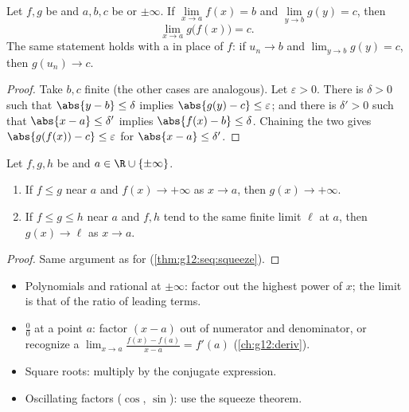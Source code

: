 \begin{theorem}\label{thm:g12:limcont:composition}
Let $f, g$ be  and $a, b, c$ be  or $\pm\infty$. If
$\lim\limits_{x \to a} f(x) = b$ and $\lim\limits_{y \to b} g(y) = c$, then
\[
\lim_{x \to a} g\bigl(f(x)\bigr) = c .
\]
The same statement holds with a  in place of $f$: if
$u_n \to b$ and $\lim_{y\to b} g(y) = c$, then $g(u_n) \to c$.
\end{theorem}

\begin{proof}
Take $b, c$ finite (the other cases are analogous). Let $\varepsilon > 0$.
There is $\delta > 0$ such that $\abs{y - b} \leq \delta$ implies
$\abs{g(y) - c} \leq \varepsilon$; and there is $\delta' > 0$ such that
$\abs{x - a} \leq \delta'$ implies $\abs{f(x) - b} \leq \delta$. Chaining the
two gives $\abs{g(f(x)) - c} \leq \varepsilon$ for
$\abs{x - a} \leq \delta'$.
\end{proof}

\begin{theorem}\label{thm:g12:limcont:squeeze}
Let $f, g, h$ be  and $a \in \R \cup \{\pm\infty\}$.
\begin{enumerate}
  \item If $f \leq g$ near $a$ and $f(x) \to +\infty$ as $x \to a$, then
        $g(x) \to +\infty$.
  \item If $f \leq g \leq h$ near $a$ and $f, h$ tend to the same finite
        limit $\ell$ at $a$, then $g(x) \to \ell$ as $x \to a$.
\end{enumerate}
\end{theorem}

\begin{proof}
Same argument as for  (\cref{thm:g12:seq:squeeze}).
\end{proof}

\begin{method}\label{met:g12:limcont:limits}
\begin{itemize}
  \item Polynomials and rational  at $\pm\infty$: factor out the
        highest power of $x$; the limit is that of the ratio of leading
        terms.
  \item $\frac{0}{0}$ at a point $a$: factor $(x-a)$ out of numerator and
        denominator, or recognize a 
        $\lim_{x\to a}\frac{f(x)-f(a)}{x-a} = f'(a)$ (\cref{ch:g12:deriv}).
  \item Square roots: multiply by the conjugate expression.
  \item Oscillating factors ($\cos$, $\sin$): use the squeeze theorem.
\end{itemize}
\end{method}

